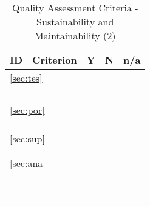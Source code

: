 \documentclass[a4paper,11pt]{article}
\begin{document}
\begin{table}[hbt]
	\begin{tabular}
		{ p{} | 
			p{} |
			p{} |
			p{} |
			p{} }
        \hline
        \textbf{ID} & \textbf{Criterion} & \textbf{Y} & \textbf{N} & \textbf{n/a} \\
        \hline 
        		\multicolumn{5}{l}{\ref{sec:tes}{ }\nameref{sec:tes}} \\
		\hline
		\hyperref[id:ts1]{\tsOneID} & \tsOneText & & & \\
		\hyperref[id:ts2]{\tsTwoID} & \tsTwoText & & & \\
		\hyperref[id:ts3]{\tsThreeID} & \tsThreeText & & & \\
		\hyperref[id:ts4]{\tsFourID} & \tsFourText & & & \\
		\hline
        \multicolumn{5}{l}{\ref{sec:por}{ }\nameref{sec:por}} \\
		\hline	
		\hyperref[id:pb1]{\pbOneID} & \pbOneText & & & \\
		\hyperref[id:pb2]{\pbTwoID} & \pbTwoText & & & \\
		\hyperref[id:pb3]{\pbThreeID} & \pbThreeText & & & \\
		\hline	
		\multicolumn{5}{l}{\ref{sec:sup}{ }\nameref{sec:sup}} \\
		\hline	
		\hyperref[id:sp1]{\spOneID} & \spOneText & & & \\
		\hyperref[id:sp2]{\spTwoID} & \spTwoText & & & \\
		\hline
		\multicolumn{5}{l}{\ref{sec:ana}{ }\nameref{sec:ana}} \\
		\hline	
		\hyperref[id:an1]{\anOneID} & \anOneText & & & \\
		\hyperref[id:an2]{\anTwoID} & \anTwoText & & & \\
		\hyperref[id:an3]{\anThreeID} & \anThreeText & & & \\
		\hyperref[id:an4]{\anFourID} & \anFourText & & & \\
		\hyperref[id:an5]{\anFiveID} & \anFiveText & & & \\
		\hyperref[id:an6]{\anSixID} & \anSixText & & & \\
		\hyperref[id:an7]{\anSevenID} & \anSevenText & & & \\
		\hyperref[id:an8]{\anEightID} & \anEightText & & & \\
		\hline
	\end{tabular}
	\caption{Quality Assessment Criteria - Sustainability and Maintainability (2)}
	\label{tab:criteriaSustMaint2}
\end{table}
\end{document}
